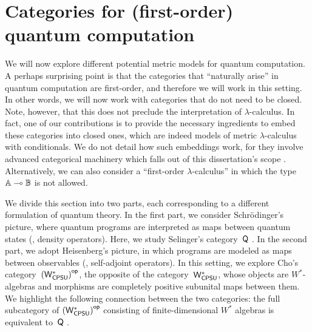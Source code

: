 \section{Categories for (first-order) quantum computation} \label{sec:quantum_cats}
We will now explore different potential metric models for quantum computation.
A perhaps surprising point is that the categories that ``naturally arise'' in quantum computation are first-order, and therefore we will work in this setting. In other words, we will now work with categories that do not need to be closed. Note, however, that this does not preclude the interpretation of $\lambda$-calculus. In fact, one of our contributions is to provide the necessary ingredients to embed these categories into closed ones, which are indeed models of metric $\lambda$-calculus with conditionals. We do not detail how such embeddings work, for they involve advanced categorical machinery which falls out of this dissertation's scope \cite{borceuxHandbookCategoricalAlgebra1994}. Alternatively, we can also consider a ``first-order $\lambda$-calculus'' in which the type $\mathbb{A} \multimap \mathbb{B}$ is not allowed.




We divide this section into two parts, each corresponding to a different formulation of quantum theory. In the first part, we consider Schr\"odinger's picture, where quantum programs are interpreted as maps between quantum states (\ie, density operators). Here, we study Selinger's category~$\mathsf{Q}$ \cite{selinger2004towards}.
In the second part, we adopt Heisenberg's picture, in which programs are modeled as maps between observables (\ie, self-adjoint operators). In this setting, we explore Cho's category~$\left(\mathsf{W^*_{CPSU}}\right)^{\mathsf{op}}$, the opposite of the category~$\mathsf{W^*_{CPSU}}$, whose objects are \( W^* \)-algebras and morphisms are completely positive subunital maps between them. 
We highlight the following connection between the two categories: the full subcategory of $\left(\mathsf{W^*_{CPSU}}\right)^{\mathsf{op}}$ consisting of finite-dimensional \( W^* \) algebras is equivalent to~$\mathsf{Q}$ \cite{choSemanticsQuantumProgramming2016}.



